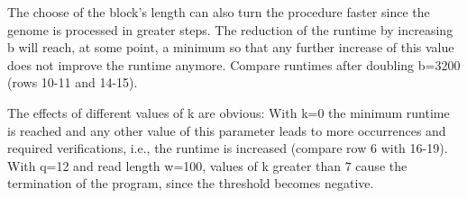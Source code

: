 \documentclass[11pt, notitlepage]{scrartcl}
\begin{document}
The choose of the block's length can also turn the procedure faster since the genome is processed in greater steps. The
reduction of the runtime by increasing b will reach, at some point, a minimum so that any further increase of this value
does not improve the runtime anymore. Compare runtimes after doubling b=3200 (rows 10-11 and 14-15).

The effects of different values of k are obvious: With k=0 the minimum runtime is reached and any other value of this
parameter leads to more occurrences and required verifications, i.e., the runtime is increased (compare row 6 with 16-19). With q=12 and read length w=100, values of k greater than 7 cause the termination of the program, since the threshold becomes negative.


\end{document}
